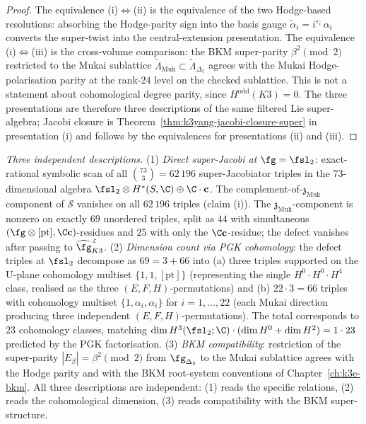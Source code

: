 \begin{proof}
The equivalence (i)$\Leftrightarrow$(ii) is the equivalence of the
two Hodge-based resolutions: absorbing
the Hodge-parity sign into the basis gauge
$\widetilde{\alpha}_i = i^{\varepsilon_i}\, \alpha_i$ converts the
super-twist into the central-extension presentation. The
equivalence (i)$\Leftrightarrow$(iii) is the cross-volume comparison:
the BKM
super-parity $\beta^2 \pmod 2$ restricted to the Mukai sublattice
$\widetilde{\Lambda}_{\mathrm{Muk}}
 \subset \widetilde{\Lambda}_{\Delta_5}$
agrees with the Mukai Hodge-polarisation parity at the rank-$24$
level on the checked sublattice. This is not a statement about
cohomological degree parity, since $H^{\mathrm{odd}}(K3)=0$. The
three presentations are therefore three descriptions of
the same filtered Lie super-algebra; Jacobi closure is
Theorem~\ref{thm:k3yang-jacobi-closure-super} in presentation (i)
and follows by the equivalences for presentations (ii) and
(iii).
\end{proof}

\noindent\textit{Three independent descriptions.}
(1) \emph{Direct super-Jacobi at $\fg = \fsl_2$}: exact-rational
symbolic scan of all $\binom{73}{3} = 62\,196$ super-Jacobiator
triples in the $73$-dimensional algebra $\fsl_2 \otimes H^*(S, \C)
\oplus \C \cdot \mathbf c$.
The complement-of-$\mathfrak z_{\mathrm{Muk}}$ component of
$\mathcal S$ vanishes on all $62\,196$ triples (claim (i)). The
$\mathfrak z_{\mathrm{Muk}}$-component is nonzero on exactly
$69$ unordered triples, split as $44$ with simultaneous
$(\fg \otimes [\mathrm{pt}], \C \mathbf c)$-residues and $25$
with only the $\C \mathbf c$-residue; the defect vanishes after
passing to $\widehat{\fg}_{K3}^{\,\varepsilon}$.
(2) \emph{Dimension count via PGK cohomology}: the defect triples
at $\fsl_2$ decompose as $69 = 3 + 66$ into (a) three
triples supported on the U-plane cohomology multiset
$\{1, 1, [\mathrm{pt}]\}$ (representing the single $H^0 \cdot H^0
\cdot H^4$ class, realised as the three
$(E, F, H)$-permutations) and (b) $22 \cdot 3 = 66$ triples with
cohomology multiset $\{1, \alpha_i, \alpha_i\}$ for $i = 1, \ldots, 22$
(each Mukai direction producing three independent
$(E, F, H)$-permutations). The total corresponds to $23$
cohomology classes, matching
$\dim H^3(\fsl_2; \C) \cdot (\dim H^0 + \dim H^2) = 1 \cdot 23$
predicted by the PGK factorisation.
(3) \emph{BKM compatibility}: restriction of the super-parity
$|E_\beta| = \beta^2 \pmod 2$ from $\fg_{\Delta_5}$ to the Mukai
sublattice agrees with the Hodge parity and with the
BKM root-system conventions of Chapter~\ref{ch:k3e-bkm}. All
three descriptions are independent: (1) reads the specific relations,
(2) reads the cohomological dimension, (3) reads compatibility
with the BKM super-structure.

